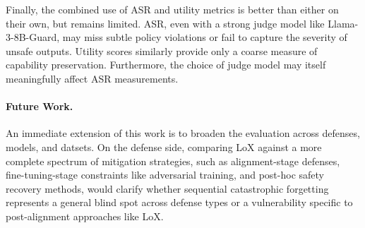 \documentclass[letterpaper,twocolumn,10pt]{article}
\begin{document}
Finally, the combined use of ASR and utility metrics is better than either on their own, but remains limited. ASR, even with a strong judge model like Llama-3-8B-Guard, may miss subtle policy violations or fail to capture the severity of unsafe outputs. Utility scores similarly provide only a coarse measure of capability preservation. Furthermore, the choice of judge model may itself meaningfully affect ASR measurements. 




\paragraph{Future Work.}
An immediate extension of this work is to broaden the evaluation across defenses, models, and datsets. On the defense side, comparing LoX against a more complete spectrum of mitigation strategies, such as alignment-stage defenses, fine-tuning-stage constraints like adversarial training, and post-hoc safety recovery methods, would clarify whether sequential catastrophic forgetting represents a general blind spot across defense types or a vulnerability specific to post-alignment approaches like LoX.
\end{document}
